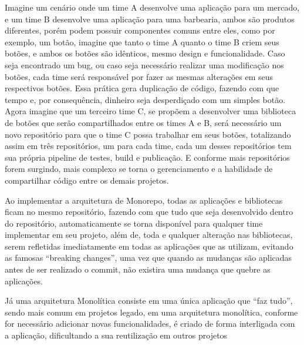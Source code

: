 Imagine um cenário onde um time A desenvolve uma aplicação para um mercado, e um time B desenvolve uma aplicação para uma barbearia, ambos são produtos diferentes, porém podem possuir componentes comuns entre eles, como por exemplo, um botão, imagine que tanto o time A quanto o time B criem seus botões, e ambos os botões são idênticos, mesmo design e funcionalidade. Caso seja encontrado um bug, ou caso seja necessário realizar uma modificação nos botões, cada time será responsável por fazer as mesmas alterações em seus respectivos botões. Essa prática gera duplicação de código, fazendo com que tempo e, por consequência, dinheiro seja desperdiçado com um simples botão. Agora imagine que um terceiro time C, se propõem a desenvolver uma biblioteca de botões que serão compartilhados entre os times A e B, será necessário um novo repositório para que o time C possa trabalhar em seus botões, totalizando assim em três repositórios, um para cada time, cada um desses repositórios tem sua própria pipeline de testes, build e publicação. E conforme mais repositórios forem surgindo, mais complexo se torna o gerenciamento e a habilidade de compartilhar código entre os demais projetos. 

Ao implementar a arquitetura de Monorepo, todas as aplicações e bibliotecas ficam no mesmo repositório, fazendo com que tudo que seja desenvolvido dentro do repositório, automaticamente se torna disponível para qualquer time  implementar em seu projeto, além de, toda e qualquer alteração nas bibliotecas, serem refletidas imediatamente em todas as aplicações que as utilizam, evitando as famosas “breaking changes”, uma vez que quando as mudanças são aplicadas antes de ser realizado o commit, não existira uma mudança que quebre as aplicações. 

Já uma arquitetura Monolítica consiste em uma única aplicação que “faz tudo”, sendo mais comum em projetos legado, em uma arquitetura monolítica, conforme for necessário adicionar novas funcionalidades, é criado de forma interligada com a aplicação, dificultando a sua reutilização em outros projetos 